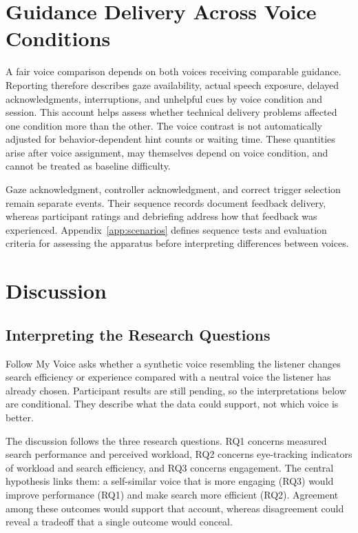\section{Guidance Delivery Across Voice Conditions}
A fair voice comparison depends on both voices receiving comparable guidance. Reporting therefore describes gaze availability, actual speech exposure, delayed acknowledgments, interruptions, and unhelpful cues by voice condition and session. This account helps assess whether technical delivery problems affected one condition more than the other. The voice contrast is not automatically adjusted for behavior-dependent hint counts or waiting time. These quantities arise after voice assignment, may themselves depend on voice condition, and cannot be treated as baseline difficulty.

Gaze acknowledgment, controller acknowledgment, and correct trigger selection remain separate events. Their sequence records document feedback delivery, whereas participant ratings and debriefing address how that feedback was experienced. Appendix~\ref{app:scenarios} defines sequence tests and evaluation criteria for assessing the apparatus before interpreting differences between voices.

\section{Discussion}
\label{ch:discussion}
\subsection{Interpreting the Research Questions}
Follow My Voice asks whether a synthetic voice resembling the listener changes search efficiency or experience compared with a neutral voice the listener has already chosen. Participant results are still pending, so the interpretations below are conditional. They describe what the data could support, not which voice is better.

The discussion follows the three research questions. RQ1 concerns measured search performance and perceived workload, RQ2 concerns eye-tracking indicators of workload and search efficiency, and RQ3 concerns engagement. The central hypothesis links them: a self-similar voice that is more engaging (RQ3) would improve performance (RQ1) and make search more efficient (RQ2). Agreement among these outcomes would support that account, whereas disagreement could reveal a tradeoff that a single outcome would conceal.

